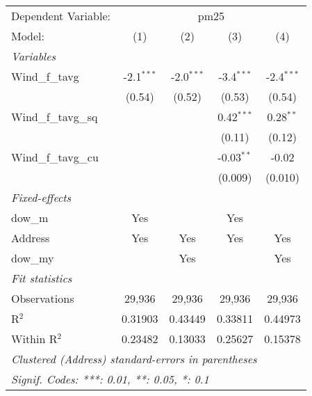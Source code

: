 
\begingroup
\centering
\begin{tabular}{lcccc}
   \tabularnewline \midrule \midrule
   Dependent Variable: & \multicolumn{4}{c}{pm25}\\
   Model:               & (1)          & (2)          & (3)          & (4)\\  
   \midrule
   \emph{Variables}\\
   Wind\_f\_tavg        & -2.1$^{***}$ & -2.0$^{***}$ & -3.4$^{***}$ & -2.4$^{***}$\\   
                        & (0.54)       & (0.52)       & (0.53)       & (0.54)\\   
   Wind\_f\_tavg\_sq    &              &              & 0.42$^{***}$ & 0.28$^{**}$\\   
                        &              &              & (0.11)       & (0.12)\\   
   Wind\_f\_tavg\_cu    &              &              & -0.03$^{**}$ & -0.02\\   
                        &              &              & (0.009)      & (0.010)\\   
   \midrule
   \emph{Fixed-effects}\\
   dow\_m               & Yes          &              & Yes          & \\  
   Address              & Yes          & Yes          & Yes          & Yes\\  
   dow\_my              &              & Yes          &              & Yes\\  
   \midrule
   \emph{Fit statistics}\\
   Observations         & 29,936       & 29,936       & 29,936       & 29,936\\  
   R$^2$                & 0.31903      & 0.43449      & 0.33811      & 0.44973\\  
   Within R$^2$         & 0.23482      & 0.13033      & 0.25627      & 0.15378\\  
   \midrule \midrule
   \multicolumn{5}{l}{\emph{Clustered (Address) standard-errors in parentheses}}\\
   \multicolumn{5}{l}{\emph{Signif. Codes: ***: 0.01, **: 0.05, *: 0.1}}\\
\end{tabular}
\par\endgroup


